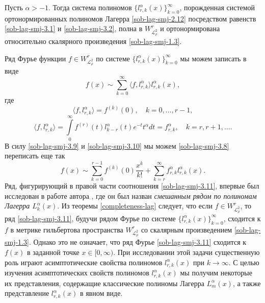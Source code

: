 \begin{theorem}\label{completeness-lag}
Пусть $\alpha>-1$. Тогда система полиномов $\{l_{r,k}^{\alpha}(x)\}_{k=0}^\infty$, порожденная системой ортонормированных полиномов Лагерра \eqref{sob-lag-smj-2.12} посредством равенств \eqref{sob-lag-smj-3.1} и \eqref{sob-lag-smj-3.2}, полна  в $W^r_{\mathcal{L}^2_\rho}$ и ортонормирована относительно скалярного произведения \eqref{sob-lag-smj-1.3}.
\end{theorem}

Ряд Фурье функции $f\in W^r_{\mathcal{L}^2_\rho}$ по системе $\{l_{r,k}^{\alpha}(x)\}_{k=0}^\infty$
мы можем записать в виде
\begin{equation}\label{sob-lag-smj-3.8}
f(x)\sim  \sum_{k=0}^\infty \langle f,l_{r,k}^\alpha \rangle  l_{r,k}^\alpha(x),
\end{equation}
где
\begin{equation}\label{sob-lag-smj-3.9}
\langle f,l_{r,k}^\alpha \rangle = f^{(k)}(0),\quad k=0,\ldots, r-1,
\end{equation}
\begin{equation}\label{sob-lag-smj-3.10}
\langle f,l_{r,k}^\alpha \rangle = \int\limits_0^\infty f^{(r)}(t) l_{k-r}^\alpha(t)e^{-t}t^\alpha dt=f_{r,k}^\alpha,\quad k=r,r+1,\ldots.
     \end{equation}
В силу \eqref{sob-lag-smj-3.9}  и \eqref{sob-lag-smj-3.10} мы можем \eqref{sob-lag-smj-3.8} переписать еще так
\begin{equation}\label{sob-lag-smj-3.11}
f(x)\sim \sum_{k=0}^{r-1} f^{(k)}(0)\frac{x^k}{k!}+ \sum_{k=r}^\infty f_{r,k}^\alpha l_{r,k}^\alpha(x).
\end{equation}
Ряд, фигурирующий в правой части соотношения \eqref{sob-lag-smj-3.11}, впервые был исследован в работе автора \cite{sob-lag-smj-Shar13}, где он был назван \textit{смешанным рядом по полиномам Лагерра $L_{k}^\alpha(x)$}. Из теоремы \ref{completeness-lag} следует, что если   $f\in W^r_{\mathcal{L}^2_\rho}$, то ряд \eqref{sob-lag-smj-3.11}, будучи  рядом Фурье  по системе $\{l_{r,k}^{\alpha}(x)\}_{k=0}^\infty$, сходится к $f$ в метрике гильбертова пространства $W^r_{\mathcal{L}^2_\rho}$ со скалярным произведением \eqref{sob-lag-smj-1.3}.
Однако это не означает, что ряд Фурье \eqref{sob-lag-smj-3.11} сходится к $f(x)$ в заданной точке $x\in[0,\infty)$.  При исследовании этой задачи существенную роль играют асимптотические свойства полиномов $l_{r,k}^{\alpha}(x)$ при $k\to\infty$. С целью изучения асимптотических свойств  полиномов $l_{r,k}^{\alpha}(x)$ мы получим некоторые их представления, содержащие   классические полиномы Лагерра $L_{m}^{\alpha}(x)$, а также представление $l_{r,k}^{\alpha}(x)$  в явном виде.

